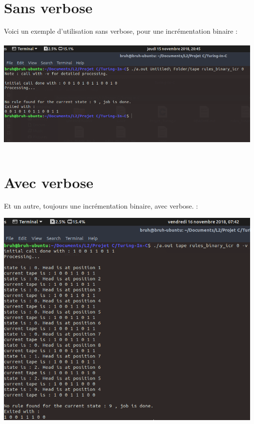 \documentclass[12pt,a4paper]{report}
\begin{document}
\section{Sans verbose}
Voici un exemple d'utilisation sans verbose, pour une incrémentation binaire :\\ \\
\includegraphics[scale=2.0]{screen1.png}
\\ \\
\section{Avec verbose}
Et un autre, toujours une incrémentation binaire, avec verbose. :

\includegraphics[scale=1.9]{screen2.png}
\end{document}
